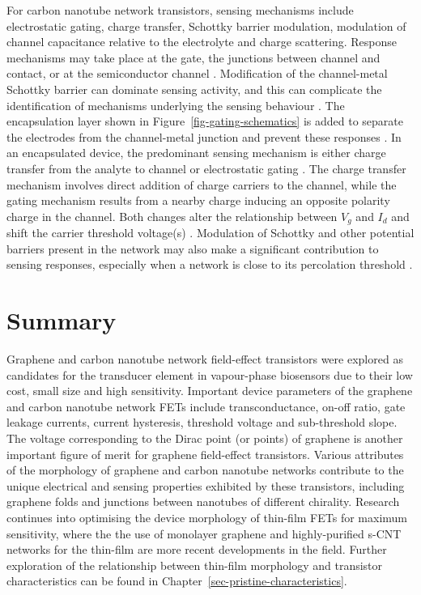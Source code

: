 \documentclass[
  a4paper,
]{scrbook}
\begin{document}
For carbon nanotube network transistors, sensing mechanisms include
electrostatic gating, charge transfer, Schottky barrier modulation,
modulation of channel capacitance relative to the electrolyte and charge
scattering. Response mechanisms may take place at the gate, the
junctions between channel and contact, or at the semiconductor channel
\autocite{Heller2008,Battie2011,Boyd2014,Tran2016,Li2023}. Modification
of the channel-metal Schottky barrier can dominate sensing activity, and
this can complicate the identification of mechanisms underlying the
sensing behaviour \autocite{Cao2009,Boyd2014,Schroeder2019}. The
encapsulation layer shown in Figure~\ref{fig-gating-schematics} is added
to separate the electrodes from the channel-metal junction and prevent
these responses \autocite{Heller2008,Shkodra2021}. In an encapsulated
device, the predominant sensing mechanism is either charge transfer from
the analyte to channel \autocite{Allen2007,Battie2011} or electrostatic
gating \autocite{Heller2008}. The charge transfer mechanism involves
direct addition of charge carriers to the channel, while the gating
mechanism results from a nearby charge inducing an opposite polarity
charge in the channel. Both changes alter the relationship between
\(V_g\) and \(I_d\) and shift the carrier threshold voltage(s)
\autocite{Tran2016,Shkodra2021,Li2023}. Modulation of Schottky and other
potential barriers present in the network may also make a significant
contribution to sensing responses, especially when a network is close to
its percolation threshold \autocite{Boyd2014,Murugathas2019}.

\hypertarget{summary}{%
\section{Summary}\label{summary}}

Graphene and carbon nanotube network field-effect transistors were
explored as candidates for the transducer element in vapour-phase
biosensors due to their low cost, small size and high sensitivity.
Important device parameters of the graphene and carbon nanotube network
FETs include transconductance, on-off ratio, gate leakage currents,
current hysteresis, threshold voltage and sub-threshold slope. The
voltage corresponding to the Dirac point (or points) of graphene is
another important figure of merit for graphene field-effect transistors.
Various attributes of the morphology of graphene and carbon nanotube
networks contribute to the unique electrical and sensing properties
exhibited by these transistors, including graphene folds and junctions
between nanotubes of different chirality. Research continues into
optimising the device morphology of thin-film FETs for maximum
sensitivity, where the the use of monolayer graphene and highly-purified
s-CNT networks for the thin-film are more recent developments in the
field. Further exploration of the relationship between thin-film
morphology and transistor characteristics can be found in
Chapter~\ref{sec-pristine-characteristics}.
\end{document}
